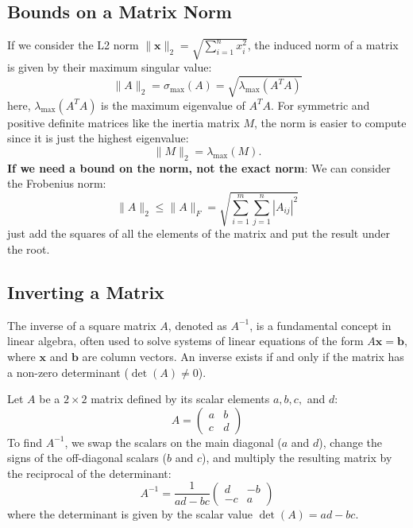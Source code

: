 \documentclass[10pt, a4paper]{report}
\begin{document}
\subsection*{Bounds on a Matrix Norm}
If we consider the L2 norm $\|\mathbf x\|_2=\sqrt{\sum_{i=1}^n x_i^2}$, the induced norm of a matrix is given by their maximum singular value:\begin{equation}
    \|A\|_2=\sigma_{\max}(A)=\sqrt{\lambda_{\max}(A^TA)}
\end{equation}
here, $\lambda_{\max}(A^TA)$ is the maximum eigenvalue of $A^TA$. For symmetric and positive definite matrices like the inertia matrix $M$, the norm is easier to compute since it is just the highest eigenvalue:\begin{equation}
    \|M\|_2=\lambda_{\max}(M).
\end{equation}
\textbf{If we need a bound on the norm, not the exact norm}: We can consider the Frobenius norm:\begin{equation}
    \|A\|_2\le \|A\|_F=\sqrt{\sum_{i=1}^m\sum_{j=1}^n |A_{ij}|^2}\label{eq:Frobenius}
\end{equation}
just add the squares of all the elements of the matrix and put the result under the root.
\subsection*{Inverting a Matrix}

The inverse of a square matrix $A$, denoted as $A^{-1}$, is a fundamental concept in linear algebra, often used to solve systems of linear equations of the form $A\mathbf{x} = \mathbf{b}$, where $\mathbf{x}$ and $\mathbf{b}$ are column vectors. An inverse exists if and only if the matrix has a non-zero determinant ($\det(A) \neq 0$).
\bigskip


Let $A$ be a $2 \times 2$ matrix defined by its scalar elements $a, b, c,$ and $d$:
$$
A = \begin{pmatrix} a & b \\ c & d \end{pmatrix}
$$
To find $A^{-1}$, we swap the scalars on the main diagonal ($a$ and $d$), change the signs of the off-diagonal scalars ($b$ and $c$), and multiply the resulting matrix by the reciprocal of the determinant:
$$
A^{-1} = \frac{1}{ad - bc} \begin{pmatrix} d & -b \\ -c & a \end{pmatrix}
$$
where the determinant is given by the scalar value $\det(A) = ad - bc$.
\end{document}
